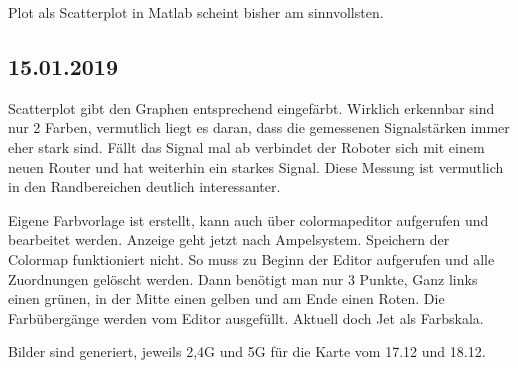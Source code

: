 \documentclass{scrartcl}%
\begin{document}
Plot als Scatterplot in Matlab scheint bisher am sinnvollsten.

\subsection{15.01.2019}
Scatterplot gibt den Graphen entsprechend eingefärbt. Wirklich erkennbar sind nur 2 Farben, vermutlich liegt es daran, dass die gemessenen Signalstärken immer eher stark sind. Fällt das Signal mal ab verbindet der Roboter sich mit einem neuen Router und hat weiterhin ein starkes Signal. Diese Messung ist vermutlich in den Randbereichen deutlich interessanter.

Eigene Farbvorlage ist erstellt, kann auch über colormapeditor aufgerufen und bearbeitet werden. Anzeige geht jetzt nach Ampelsystem. Speichern der Colormap funktioniert nicht. So muss zu Beginn der Editor aufgerufen und alle Zuordnungen gelöscht werden. Dann benötigt man nur 3 Punkte, Ganz links einen grünen, in der Mitte einen gelben und am Ende einen Roten. Die Farbübergänge werden vom Editor ausgefüllt. Aktuell doch Jet als Farbskala.

Bilder sind generiert, jeweils 2,4G und 5G für die Karte vom 17.12 und 18.12.
\end{document}
